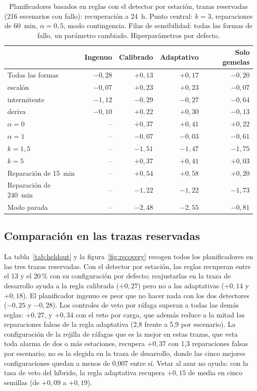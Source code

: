 \documentclass[preprint,11pt]{elsarticle}
\begin{document}
\begin{table}[t]
\centering
\caption{Planificadores basados en reglas con el detector por estación, trazas reservadas (216 escenarios con fallo): recuperación a 24~h. Punto central: $k=3$, reparaciones de 60~min, $\alpha=0{,}5$, modo contingencia. Filas de sensibilidad: todas las formas de fallo, un parámetro cambiado. Hiperparámetros por defecto.}
\label{tab:sweep}
\small
\begin{tabular}{lrrrr}
\toprule
 & Ingenuo & Calibrado & Adaptativo & Solo gemelas \\
\midrule
Todas las formas & $-0{,}28$ & $+0{,}13$ & $+0{,}17$ & $-0{,}20$ \\
\quad escalón & $-0{,}07$ & $+0{,}23$ & $+0{,}23$ & $-0{,}07$ \\
\quad intermitente & $-1{,}12$ & $-0{,}29$ & $-0{,}27$ & $-0{,}64$ \\
\quad deriva & $-0{,}10$ & $+0{,}22$ & $+0{,}30$ & $-0{,}13$ \\
\midrule
$\alpha = 0$ & -- & $+0{,}37$ & $+0{,}41$ & $+0{,}22$ \\
$\alpha = 1$ & -- & $-0{,}07$ & $-0{,}03$ & $-0{,}61$ \\
$k = 1{,}5$ & -- & $-1{,}51$ & $-1{,}47$ & $-1{,}75$ \\
$k = 5$ & -- & $+0{,}37$ & $+0{,}41$ & $+0{,}03$ \\
Reparación de 15~min & -- & $+0{,}54$ & $+0{,}58$ & $+0{,}20$ \\
Reparación de 240~min & -- & $-1{,}22$ & $-1{,}22$ & $-1{,}73$ \\
Modo parada & -- & $-2{,}48$ & $-2{,}55$ & $-0{,}81$ \\
\bottomrule
\end{tabular}
\end{table}

\subsection{Comparación en las trazas reservadas}
La tabla~\ref{tab:heldout} y la figura~\ref{fig:recovery} recogen todos los planificadores en las tres trazas reservadas. Con el detector por estación, las reglas recuperan entre el 13 y el 20\,\% con su configuración por defecto; reajustarlas en la traza de desarrollo ayuda a la regla calibrada ($+0{,}27$) pero no a las adaptativas ($+0{,}14$ y $+0{,}18$). El planificador ingenuo es peor que no hacer nada con los dos detectores ($-0{,}25$ y $-0{,}28$). Los controles de veto por ráfaga superan a todas las demás reglas: $+0{,}27$, y $+0{,}34$ con el veto por carga, que además reduce a la mitad las reparaciones falsas de la regla adaptativa (2{,}8 frente a 5{,}9 por escenario). La configuración de la rejilla de ráfagas que es la mejor en estas trazas, que veta toda alarma de dos o más estaciones, recupera $+0{,}37$ con 1{,}3 reparaciones falsas por escenario; no es la elegida en la traza de desarrollo, donde las cinco mejores configuraciones quedan a menos de 0{,}007 entre sí. Vetar al azar no ayuda: con la tasa de veto del híbrido, la regla adaptativa recupera $+0{,}15$ de media en cinco semillas (de $+0{,}09$ a $+0{,}19$).
\end{document}
